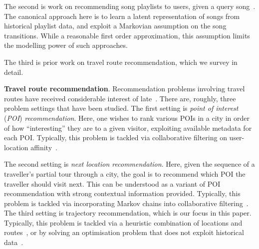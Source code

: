The second is work on recommending song playlists to users, given a query song~\citep{McFee:2011,chen2012playlist}.
The canonical approach here is to
learn a latent representation of songs from historical playlist data,
and exploit a Markovian assumption on the song transitions.
While a reasonable first order approximation, this assumption limits the modelling power of such approaches.

The third is prior work on travel route recommendation, which we survey in detail.



\textbf{Travel route recommendation}.
Recommendation problems involving travel routes have received considerable interest of late~\cite{bao2015recommendations,zheng2015trajectory,zheng2014urban}.
There are, roughly, three problem settings that have been studied.
The first setting is \emph{point of interest} (\emph{POI}) \emph{recommendation}.
Here, one wishes to rank various POIs in a city in order of how ``interesting'' they are to a given visitor,
exploiting
available metadata for each POI.
Typically, this problem is tackled via
collaborative filtering on user-location affinity~\cite{shi2011personalized,lian2014geomf,hsieh2014mining,yuan2014graph}.

The second setting is \emph{next location recommendation}.
Here, given the sequence of a traveller's partial tour through a city,
the goal is to recommend which POI the traveller should visit next.
This can be understood as a variant of POI recommendation with strong contextual information provided.
Typically, this problem is tackled via
incorporating Markov chains into collaborative filtering~\cite{fpmc10,ijcai13,zhang2015location}.
The third setting is trajectory recommendation,
which is our focus in this paper.
Typically, this problem is tackled via
a heuristic combination of locations and routes~\cite{lu2010photo2trip,ijcai15,lu2012personalized}, or
by solving an optimisation problem that does not exploit historical data~\cite{gioniswsdm14,chen2015tripplanner}.


